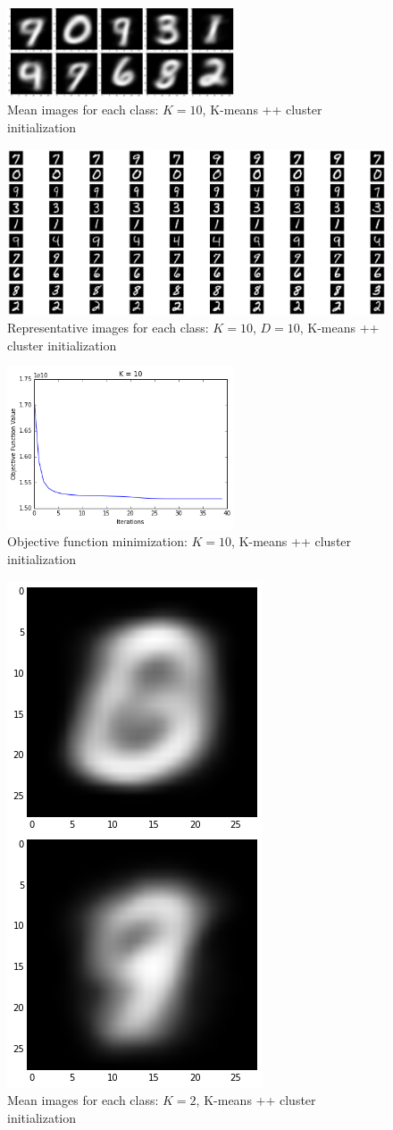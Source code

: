 \documentclass[submit]{harvardml}
\begin{document}

\begin{figure}
	\centering
	\includegraphics[width=0.6\textwidth]{output_2_0.png}
	\caption{Mean images for each class: $K = 10$, K-means ++ cluster initialization }
\end{figure}

\begin{figure}
	\centering
	\includegraphics[width=1.0\textwidth]{output_2_1.png}
	\caption{Representative images for each class: $K = 10$, $D = 10$, K-means ++ cluster initialization }
\end{figure}

\begin{figure}
	\centering
	\includegraphics[width=0.6\textwidth]{output_3_0.png}
	\caption{Objective function minimization: $K = 10$, K-means ++ cluster initialization }
\end{figure}

%

\begin{figure}
	\centering
	\includegraphics[height=0.4\textwidth]{output_5_0.png}
	\caption{Mean images for each class: $K = 2$, K-means ++ cluster initialization }
\end{figure}
\end{document}
